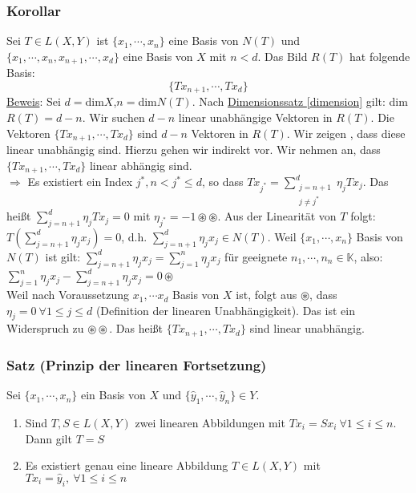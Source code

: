 \subsubsection{Korollar}
Sei $T\in L(X,Y)$ ist $\{x_1,\cdots ,x_n\}$ eine Basis von $N(T)$ und $\{x_1,\cdots ,x_n,x_{n+1},\cdots ,x_d\}$ eine Basis von $X$ mit $n<d$.  Das Bild $R(T)$ hat folgende Basis:
\[\{Tx_{n+1},\cdots ,Tx_d\}\]
\underline{Beweis}:  Sei $d=$dim$X$,$n=$dim$N(T)$.  Nach \hyperref[dimension]{Dimensionssatz \ref*{dimension}} gilt:
dim$R(T)=d-n$.  Wir suchen $d-n$ linear unabhängige Vektoren in $R(T)$.  Die Vektoren $\{Tx_{n+1},\cdots ,Tx_d\}$ sind $d-n$ Vektoren in $R(T)$.  Wir zeigen , dass diese linear unabhängig sind. Hierzu gehen wir indirekt vor.  Wir nehmen an, dass $\{Tx_{n+1},\cdots ,Tx_d\}$ linear abhängig sind.\\
$\Rightarrow$ Es existiert ein Index $j^*,n<j^*\leq d$, so dass $Tx_{j^*}=\sum_{\substack{j=n+1\\ j\not= j^*}}^d \eta _jTx_j$.  Das heißt $\sum_{j=n+1}^d \eta _jTx_j=0$ mit $\eta _{j^*}=-1 \circledast\circledast$.  Aus der Linearität von $T$ folgt: $T(\sum_{j=n+1}^d \eta _jx_j)=0$, d.h. $\sum_{j=n+1}^d \eta _jx_j \in N(T)$.  Weil $\{ x_1,\cdots ,x_n\}$ Basis von $N(T)$ ist gilt: $\sum_{j=n+1}^d\eta _jx_j=\sum_{j=1}^n\eta _jx_j$ für geeignete $n_1,\cdots ,n_n\in\mathbb{K}$, also: $\sum_{j=1}^n\eta _jx_j-\sum_{j=n+1}^d\eta _jx_j=0 \circledast$\\
Weil nach Voraussetzung $x_1,\cdots x_d$ Basis von $X$ ist, folgt aus $\circledast$, dass $\eta _j=0\ \forall 1\leq j\leq d$ (Definition der linearen Unabhängigkeit).  Das ist ein Widerspruch zu $\circledast\circledast$.  Das heißt $\{Tx_{n+1},\cdots ,Tx_d\}$ sind linear unabhängig.
\subsubsection{Satz (Prinzip der linearen Fortsetzung)}
Sei $\{x_1,\cdots ,x_n\}$ ein Basis von $X$ und $\{\hat{y}_1,\cdots ,\hat{y}_n\} \in Y$.
\renewcommand{\labelenumi}{(\alph{enumi})}
\begin{enumerate}
\item Sind $T,S\in L(X,Y)$ zwei linearen Abbildungen mit $Tx_i=Sx_i\ \forall 1\leq i\leq n$.  Dann gilt $T=S$
\item Es existiert genau eine lineare Abbildung $T\in L(X,Y)$ mit $Tx_i=\hat{y}_i,\ \forall 1\leq i\leq n$
\end{enumerate}
